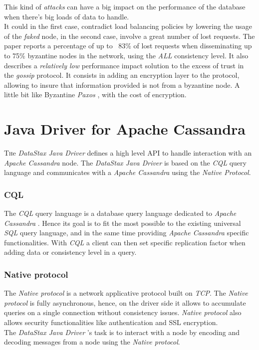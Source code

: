 \documentclass[a4paper]{report}
\newcommand{\djd}{\emph{DataStax Java Driver }}
\newcommand{\ca}{\emph{Apache Cassandra }}
\newcommand{\px}{\emph{Paxos }}
\begin{document}
This kind of \emph{attacks} can have a big impact on the performance of the database when there's big loads of data to handle. \\
It could in the first case, contradict load balancing policies by lowering the usage of the \emph{faked} node, in the second case, involve a great number of lost requests. The paper reports a percentage of up to ~83\% of lost requests when disseminating up to 75\% byzantine nodes in the network, using the \emph{ALL} consistency level. It also describes a \emph{relatively low} performance impact solution to the excess of trust in the \emph{gossip} protocol. It consists in adding an encryption layer to the protocol, allowing to insure that information provided is not from a byzantine node. A little bit like Byzantine \px\cite{Martin}, with the cost of encryption.


\chapter{Java Driver for Apache Cassandra}
\lettrine[nindent=0em,lines=3]{T} he \djd defines a high level API to handle interaction with an \ca node. The \djd is based on the \emph{CQL} query language and communicates with a \ca using the \emph{Native Protocol}.
\subsection{CQL}
The \emph{CQL} query language is a database query language dedicated to \ca. Hence its goal is to fit the most possible to the existing universal \emph{SQL} query language, and in the same time providing \ca specific functionalities. With \emph{CQL} a client can then set specific replication factor when adding data or consistency level in a query.
\subsection{Native protocol}
The \emph{Native protocol} is a network applicative protocol built on \emph{TCP}. The \emph{Native protocol} is fully asynchronous, hence, on the driver side it allows to accumulate queries on a single connection without consistency issues. \emph{Native protocol} also allows security functionalities like authentication and SSL encryption.\\
The \djd's task is to interact with a node by encoding and decoding messages from a node using the \emph{Native protocol}.
\end{document}
